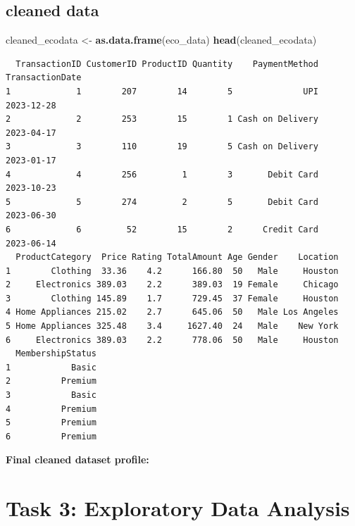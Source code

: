 \documentclass[
]{article}
\newenvironment{Shaded}{\begin{snugshade}}{\end{snugshade}}
\newcommand{\FunctionTok}[1]{\textcolor[rgb]{0.13,0.29,0.53}{\textbf{#1}}}
\newcommand{\NormalTok}[1]{#1}
\newcommand{\OtherTok}[1]{\textcolor[rgb]{0.56,0.35,0.01}{#1}}
\newcommand{\SpecialCharTok}[1]{\textcolor[rgb]{0.81,0.36,0.00}{\textbf{#1}}}
\begin{document}
\subsection{cleaned data}\label{cleaned-data}

\begin{Shaded}
\begin{Highlighting}[]
\NormalTok{cleaned\_ecodata }\OtherTok{\textless{}{-}} \FunctionTok{as.data.frame}\NormalTok{(eco\_data)}
\FunctionTok{head}\NormalTok{(cleaned\_ecodata)}
\end{Highlighting}
\end{Shaded}

\begin{verbatim}
  TransactionID CustomerID ProductID Quantity    PaymentMethod TransactionDate
1             1        207        14        5              UPI      2023-12-28
2             2        253        15        1 Cash on Delivery      2023-04-17
3             3        110        19        5 Cash on Delivery      2023-01-17
4             4        256         1        3       Debit Card      2023-10-23
5             5        274         2        5       Debit Card      2023-06-30
6             6         52        15        2      Credit Card      2023-06-14
  ProductCategory  Price Rating TotalAmount Age Gender    Location
1        Clothing  33.36    4.2      166.80  50   Male     Houston
2     Electronics 389.03    2.2      389.03  19 Female     Chicago
3        Clothing 145.89    1.7      729.45  37 Female     Houston
4 Home Appliances 215.02    2.7      645.06  50   Male Los Angeles
5 Home Appliances 325.48    3.4     1627.40  24   Male    New York
6     Electronics 389.03    2.2      778.06  50   Male     Houston
  MembershipStatus
1            Basic
2          Premium
3            Basic
4          Premium
5          Premium
6          Premium
\end{verbatim}

\textbf{Final cleaned dataset profile:}

\section{Task 3: Exploratory Data
Analysis}\label{task-3-exploratory-data-analysis}

\begin{Shaded}
\end{Shaded}
\end{document}
